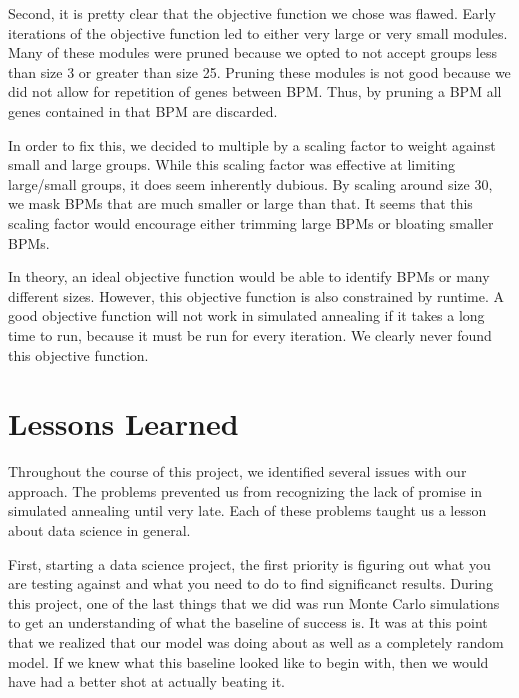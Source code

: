 \documentclass[11pt]{article}
\begin{document}
\par Second, it is pretty clear that the objective function we chose was flawed. Early iterations of the objective function led to either very large or very small modules. Many of these modules were pruned because we opted to not accept groups less than size 3 or greater than size 25. Pruning these modules is not good because we did not allow for repetition of genes between BPM. Thus, by pruning a BPM all genes contained in that BPM are discarded. 

\par In order to fix this, we decided to multiple by a scaling factor to weight against small and large groups. While this scaling factor was effective at limiting large/small groups, it does seem inherently dubious. By scaling around size 30, we mask BPMs that are much smaller or large than that. It seems that this scaling factor would encourage either trimming large BPMs or bloating smaller BPMs. 

\par In theory, an ideal objective function would be able to identify BPMs or many different sizes. However, this objective function is also constrained by runtime. A good objective function will not work in simulated annealing if it takes a long time to run, because it must be run for every iteration. We clearly never found this objective function.

\section{Lessons Learned}
\par Throughout the course of this project, we identified several issues with our approach. The problems prevented us from recognizing the lack of promise in simulated annealing until very late. Each of these problems taught us a lesson about data science in general. 

\par First, starting a data science project, the first priority is figuring out what you are testing against and what you need to do to find significanct results. During this project, one of the last things that we did was run Monte Carlo simulations to get an understanding of what the baseline of success is. It was at this point that we realized that our model was doing about as well as a completely random model. If we knew what this baseline looked like to begin with, then we would have had a better shot at actually beating it.
\end{document}
